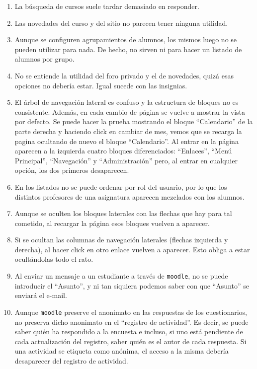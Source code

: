 \begin{enumerate}
\item La búsqueda de cursos suele tardar demasiado en responder.

\item Las novedades del curso y del sitio no parecen tener ninguna utilidad.

\item Aunque se configuren agrupamientos de alumnos, los mismos luego no se pueden utilizar para nada. De hecho, no sirven ni para hacer un listado de alumnos por grupo.

\item No se entiende la utilidad del foro privado y el de novedades, quizá esas opciones no debería estar. Igual sucede con las insignias.

\item El árbol de navegación lateral es confuso y la estructura de bloques no es consistente. Además, en cada cambio de página se vuelve a mostrar la vista por defecto. Se puede hacer la prueba mostrando el bloque ``Calendario'' de la parte derecha y haciendo click en cambiar de mes, vemos que se recarga la pagina ocultando de nuevo el bloque ``Calendario''. Al entrar en la página aparecen a la izquierda cuatro bloques diferenciados: ``Enlaces'', ``Menú Principal'', ``Navegación'' y ``Administración'' pero, al entrar en cualquier opción, los dos primeros desaparecen.

\item En los listados no se puede ordenar por rol del usuario, por lo que los distintos profesores de una asignatura aparecen mezclados con los alumnos.

\item Aunque se oculten los bloques laterales con las flechas que hay para tal cometido, al recargar la página esos bloques vuelven a aparecer.

\item Si se ocultan las columnas de navegación laterales (flechas izquierda y derecha), al hacer click en otro enlace vuelven a aparecer. Esto obliga a estar ocultándolas todo el rato.

\item Al enviar un mensaje a un estudiante a través de \texttt{moodle}, no se puede introducir el ``Asunto'', y ni tan siquiera podemos saber con que ``Asunto'' se enviará el e-mail.

\item Aunque \texttt{moodle} preserve el anonimato en las respuestas de los cuestionarios, no preserva dicho anonimato en el ``registro de actividad''. Es decir, se puede saber quién ha respondido a la encuesta e incluso, si uno está pendiente de cada actualización del registro, saber quién es el autor de cada respuesta. Si una actividad se etiqueta como anónima, el acceso a la misma debería desaparecer del registro de actividad.


\end{enumerate}
